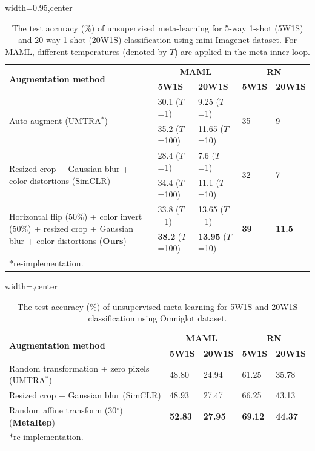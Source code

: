 \begin{table}[htbp]
\centering
  \caption{The test accuracy (\%) of unsupervised meta-learning for 5-way 1-shot (5W1S) and 20-way 1-shot (20W1S) classification using mini-Imagenet dataset. For MAML, different temperatures (denoted by ${T}$) are applied in the meta-inner loop.}
 \begin{adjustbox}{width=0.95\linewidth,center}
\tiny
    \begin{tabular}{p{4.5cm}ll|ll}
      \toprule
      \multirow{2}{4.5cm}{\bf Augmentation method} &  \multicolumn{2}{c}{\bf MAML} & \multicolumn{2}{c}{\bf RN} \\
     &  {\bf 5W1S} & {\bf 20W1S} & {\bf 5W1S} & {\bf 20W1S} \\
      \midrule
    \multirow{2}{4.5cm}{Auto augment (UMTRA$^{*}$)}  & 30.1 ($T$=1) & 9.25 ($T$=1) & \multirow{2}{*}{35} & \multirow{2}{*}{9} \\
      & 35.2 ($T$=100) & 11.65 ($T$=10) & &  \\
      \midrule
    \multirow{2}{4.5cm}{Resized crop + Gaussian blur + color distortions (SimCLR)}  & 28.4 ($T$=1)   & 7.6 ($T$=1)   & \multirow{2}{*}{32}   & \multirow{2}{*}{7}  \\
          & 34.4 ($T$=100)    & 11.1 ($T$=10)          &      &   \\
    \midrule
    \multirow{2}{4.5cm}{Horizontal flip (50\%) + color invert (50\%) + resized crop + Gaussian blur + color distortions ({\bf Ours})}    & 33.8 ($T$=1)     & 13.65 ($T$=1)          & \multirow{2}{*}{\bf 39}    &      \multirow{2}{*}{\bf 11.5}     \\
    & {\bf 38.2} ($T$=100)          & {\bf 13.95} ($T$=10)          &          &      \\
      \bottomrule
      $*$re-implementation.
    \end{tabular}
  \end{adjustbox}
  \label{tab:unsup}
\end{table}

\begin{table}[htbp]
  \caption{The test accuracy (\%) of unsupervised meta-learning for 5W1S and 20W1S classification using Omniglot dataset.}
 \begin{adjustbox}{width=\linewidth,center}
\tiny
    \begin{tabular}{p{4.5cm}ll|ll}
      \toprule
      \multirow{2}{4.5cm}{\bf Augmentation method} &  \multicolumn{2}{c}{\bf MAML} & \multicolumn{2}{c}{\bf RN} \\
     &  {\bf 5W1S} & {\bf 20W1S} & {\bf 5W1S} & {\bf 20W1S} \\
      \midrule
    Random transformation + zero pixels (UMTRA$^{*}$) & 48.80 & 24.94 & 61.25 & 35.78 \\
    Resized crop + Gaussian blur (SimCLR) & 48.93 & 27.47 & 66.25 & 43.13  \\
        Random affine transform (30$^{\circ}$) ({\bf MetaRep})  & {\bf 52.83} & {\bf 27.95}  & {\bf 69.12} & {\bf 44.37} \\
      \bottomrule
      $*$re-implementation.
    \end{tabular}
  \end{adjustbox}
  \label{tab:unsup_omni}
\end{table}

